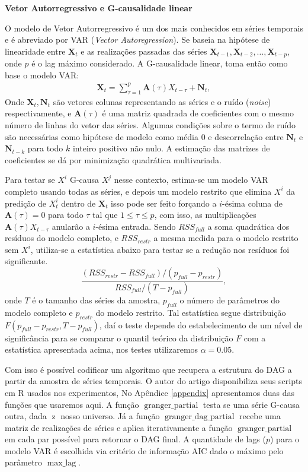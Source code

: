 \documentclass[12pt,letterpaper]{article}
\newcommand{\bd}[1]{\boldsymbol{#1}}
\newcommand{\op}{\operatorname}
\begin{document}
	 \textbf{Vetor Autorregressivo e G-causalidade linear}

	O modelo de Vetor Autorregressivo é um dos mais conhecidos em séries temporais e é abreviado por VAR (\textit{Vector Autoregression}). Se baseia na hipótese de linearidade entre $\bd X_t$ e as realizações passadas das séries $\bd X_{t-1},\bd X_{t-2},\ldots,\bd X_{t-p}$, onde $p$ é o lag máximo considerado. A G-causalidade linear, toma então como base o modelo VAR:
	\begin{align}\label{var}\displaystyle\bd X_t=\sum_{\tau=1}^p\bd A(\tau)X_{t-\tau}+\bd N_t,\end{align}
	Onde $\bd X_t,\bd N_t$ são vetores colunas representando as séries e o ruído (\textit{noise}) respectivamente, e $\bd A(\tau)$ é uma matriz quadrada de coeficientes com o mesmo número de linhas do vetor das séries. Algumas condições sobre o termo de ruído são necessárias como hipótese de modelo como média 0 e descorrelação entre $\bd N_t$ e $\bd N_{t-k}$ para todo $k$ inteiro positivo não nulo. A estimação das matrizes de coeficientes se dá por minimização quadrática multivariada.
	
	Para testar se $X^i$ G-causa $X^j$ nesse contexto, estima-se um modelo VAR completo usando todas as séries, e depois um modelo restrito que elimina $X^i$ da predição de $X^i_t$ dentro de $\bd X_t$ isso pode ser feito forçando a $i$-ésima coluna de $\bd A(\tau)=0$ para todo $\tau$ tal que $1\leq\tau\leq p$, com isso, as multiplicações $\bd A(\tau)X_{t-\tau}$ anularão a $i$-ésima entrada. Sendo $RSS_{full}$ a soma quadrática dos resíduos do modelo completo, e $RSS_{restr}$ a mesma medida para o modelo restrito sem $X^i$, utiliza-se a estatística abaixo para testar se a redução nos resíduos foi significante.
	$$\dfrac{(RSS_{restr}-RSS_{full})/(p_{full}-p_{restr})}{RSS_{full}/(T-p_{full})},$$onde $T$ é o tamanho das séries da amostra, $p_{full}$ o número de parâmetros do modelo completo e $p_{restr}$ do modelo restrito. Tal estatística segue distribuição $F(p_{full}-p_{restr},T-p_{full})$, daí o teste depende do estabelecimento de um nível de significância para se comparar o quantil teórico da distribuição $F$ com a estatística apresentada acima, nos testes utilizaremos $\alpha=0.05$.
	
	Com isso é possível codificar um algoritmo que recupera a estrutura do DAG a partir da amostra de séries temporais. O autor do artigo\cite{Peters2012phd} disponibiliza seus scripts em R usados nos experimentos, No Apêndice \ref{appendix} apresentamos duas das funções que usaremos aqui. A função $\op{granger\_partial}$ testa se uma série G-causa outra, dada $\op{z}$ nosso universo. Já a função $\op{granger\_dag\_partial}$ recebe uma matriz de realizações de séries e aplica iterativamente a função $\op{granger\_partial}$ em cada par possível para retornar o DAG final. A quantidade de lags ($p$) para o modelo VAR é escolhida via critério de informação AIC dado o máximo pelo parâmetro $\op{max\_lag}$.
	
\end{document}
